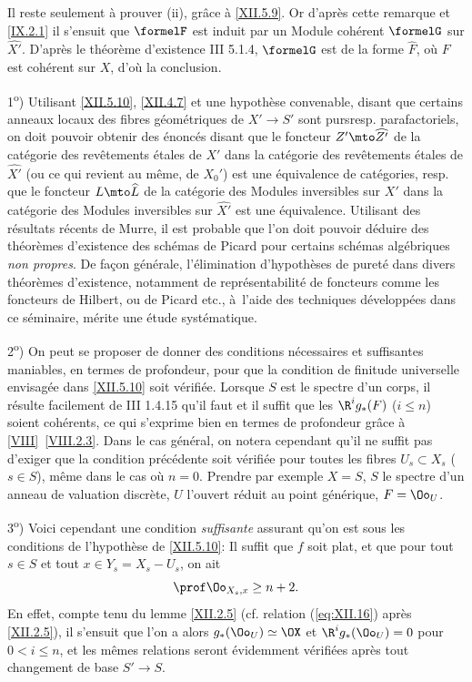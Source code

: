 Il reste seulement \`a prouver (ii), gr\^ace \`a \ref{XII.5.9}. Or d'apr\`es cette remarque et \ref{IX.2.1} il s'ensuit que $\formelF$ est induit par un Module coh\'erent $\formelG$ sur $\widehat{X'}$. D'apr\`es le th\'eor\`eme d'existence \EGA III 5.1.4, $\formelG$ est de la forme $\widehat{F}$, o\`u $F$ est coh\'erent sur $X$, d'o\`u la conclusion.

\begin{remarques} \label{XII.5.11}
1\textsuperscript{o}) Utilisant \ref{XII.5.10}, \ref{XII.4.7} et une hypoth\`ese convenable, disant que certains anneaux locaux des fibres g\'eom\'etriques de $X'\to S'$ sont \og purs\fg resp. parafactoriels, on doit pouvoir obtenir des \'enonc\'es disant que le foncteur $Z'\mto \widehat{Z'}$ de la cat\'egorie des rev\^etements \'etales de $X'$ dans la cat\'egorie des rev\^etements \'etales de $\widehat{X'}$ (ou ce qui revient au m\^eme, de $X_0'$) est une \'equivalence de cat\'egories, resp. que le foncteur $L\mto \widehat{L}$ de la cat\'egorie des Modules inversibles sur $X'$ dans la cat\'egorie des Modules inversibles sur $\widehat{X'}$ est une \'equivalence. Utilisant des r\'esultats r\'ecents de Murre, il est probable que l'on doit pouvoir d\'eduire des th\'eor\`emes d'existence des sch\'emas de Picard pour certains sch\'emas alg\'ebriques \emph{non propres}. De fa\c con g\'en\'erale, l'\'elimination d'hypoth\`eses de puret\'e dans divers th\'eor\`emes d'existence, notamment de repr\'esentabilit\'e de foncteurs comme les foncteurs de Hilbert, ou de Picard etc., \`a~l'aide des techniques d\'evelopp\'ees dans ce s\'eminaire, m\'erite une \'etude syst\'ematique.

2\textsuperscript{o}) On peut se proposer de donner des conditions n\'ecessaires et suffisantes maniables, en termes de profondeur, pour que la condition de finitude universelle envisag\'ee dans \ref{XII.5.10} soit v\'erifi\'ee. Lorsque $S$ est le spectre d'un corps, il r\'esulte facilement de \EGA III 1.4.15 qu'il faut et il suffit que les $\R^ig_\ast(F)$ ($i\leq n$) soient coh\'erents, ce qui s'exprime bien en termes de profondeur gr\^ace \`a \ref{VIII}~\ref{VIII.2.3}. Dans le cas g\'en\'eral, on notera cependant qu'il ne suffit pas d'exiger que la condition pr\'ec\'edente soit v\'erifi\'ee pour toutes les fibres $U_s\subset X_s$ ($s\in S$), m\^eme dans le cas o\`u $n=0$. Prendre par exemple $X=S$, $S$ le spectre d'un anneau de valuation discr\`ete, $U$ l'ouvert r\'eduit au point g\'en\'erique, $F=\Oo_U$.

3\textsuperscript{o}) Voici cependant une condition \emph{suffisante} assurant qu'on est sous les conditions de l'hypoth\`ese de \ref{XII.5.10}: Il suffit que $f$ soit plat, et que pour tout $s\in S$ et tout $x\in Y_s=X_s- U_s$, on ait
\[
\prof \Oo_{X_s, x}\geq n+2.
\]
En effet, compte tenu du lemme \ref{XII.2.5} (cf. relation (\ref{eq:XII.16}) apr\`es \ref{XII.2.5}), il s'ensuit que l'on a alors $g_\ast(\Oo_U)\simeq\OX$ et $\R^ig_\ast(\Oo_U)=0$ pour $0<i\leq n$, et les m\^emes relations seront \'evidemment v\'erifi\'ees apr\`es tout changement de base $S'\to S$.
\end{remarques}

